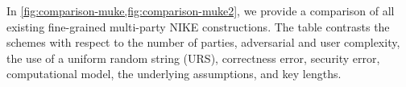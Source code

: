 In \cref{fig:comparison-muke,fig:comparison-muke2}, we provide a comparison of all existing fine-grained multi-party NIKE constructions. The table contrasts the schemes with respect to the number of parties, adversarial and user complexity, the use of a uniform random string (URS), correctness error, security error, computational model, the underlying assumptions, and key lengths. 

